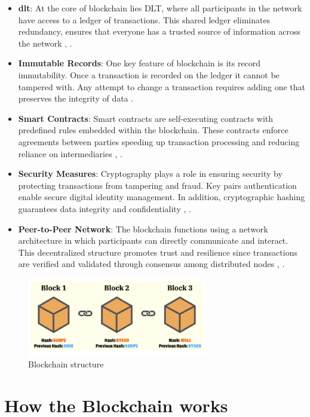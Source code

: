 \begin{itemize}
  \item \textbf{\gls{dlt}}: At the core of blockchain lies DLT, where all participants in the network have access to a ledger of transactions. 
  This shared ledger eliminates redundancy, ensures that everyone has a trusted source of information across the network \cite{ibm_blockchain}, \cite{9752154}.
  \item \textbf{Immutable Records}: One key feature of blockchain is its record immutability. Once a transaction is recorded on the ledger it cannot be tampered with. 
  Any attempt to change a transaction requires adding one that preserves the integrity of data \cite{ibm_blockchain}.
  \item \textbf{Smart Contracts}: Smart contracts are self-executing contracts with predefined rules embedded within the blockchain. These contracts enforce agreements 
  between parties speeding up transaction processing and reducing reliance on intermediaries \cite{ibm_blockchain}, \cite{9036241}.
  \item \textbf{Security Measures}: Cryptography plays a role in ensuring security by protecting transactions from tampering and fraud. Key pairs authentication 
  enable secure digital identity management. In addition, cryptographic hashing guarantees data integrity and confidentiality \cite{9596538}, \cite{9036241}.
  \item \textbf{Peer-to-Peer Network}: The blockchain functions using a network architecture in which participants can directly communicate and interact. This decentralized 
  structure promotes trust and resilience since transactions are verified and validated through consensus among distributed nodes \cite{9752154}, \cite{9036241}.
\end{itemize}

\begin{figure}[h]  
  \centering
  \includegraphics[width=0.7\textwidth]{Images/c2_1.png} 
  \caption{Blockchain structure}
\end{figure}

\section{How the Blockchain works}


